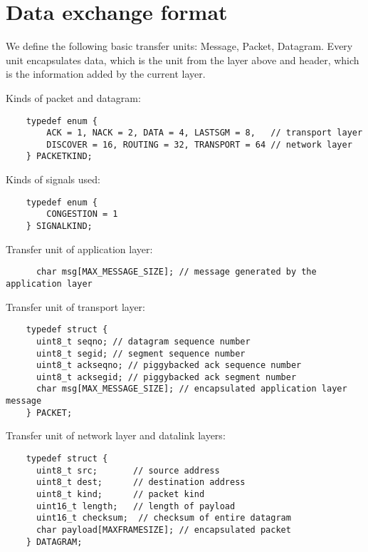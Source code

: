 \documentclass[11pt,a4paper,oneside]{report}
\begin{document}
\section*{Data exchange format}

We define the following basic transfer units: Message, Packet, Datagram.
Every unit encapsulates data, which is the unit from the layer above and header, 
which is the information added by the current layer. 

Kinds of packet and datagram:

    \begin{lstlisting}
    typedef enum {
        ACK = 1, NACK = 2, DATA = 4, LASTSGM = 8,   // transport layer
        DISCOVER = 16, ROUTING = 32, TRANSPORT = 64 // network layer
    } PACKETKIND;
    \end{lstlisting}
    
Kinds of signals used:

    \begin{lstlisting}
    typedef enum {
        CONGESTION = 1
    } SIGNALKIND;
    \end{lstlisting}

Transfer unit of application layer:
    \begin{lstlisting}
      char msg[MAX_MESSAGE_SIZE]; // message generated by the application layer
    \end{lstlisting}
  
Transfer unit of transport layer:
       
    \begin{lstlisting}
    typedef struct {
      uint8_t seqno; // datagram sequence number
      uint8_t segid; // segment sequence number
      uint8_t ackseqno; // piggybacked ack sequence number
      uint8_t acksegid; // piggybacked ack segment number
      char msg[MAX_MESSAGE_SIZE]; // encapsulated application layer message
    } PACKET;
    \end{lstlisting}
  
Transfer unit of network layer and datalink layers:   
    
    \begin{lstlisting}
    typedef struct {
      uint8_t src;       // source address
      uint8_t dest;      // destination address
      uint8_t kind;      // packet kind
      uint16_t length;   // length of payload
      uint16_t checksum;  // checksum of entire datagram
      char payload[MAXFRAMESIZE]; // encapsulated packet
    } DATAGRAM;
   \end{lstlisting}
   
\end{document}
